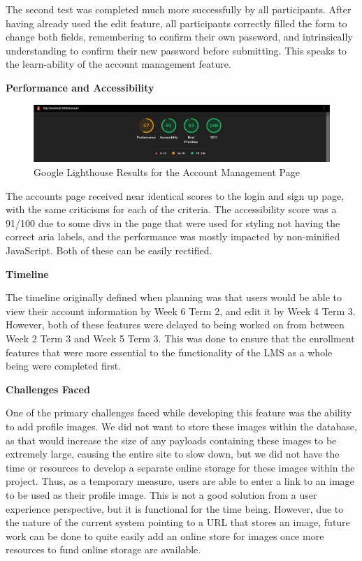 The second test was completed much more successfully by all participants. After having already used the edit feature, all participants correctly filled the form to change both fields, remembering to confirm their own password, and intrinsically understanding to confirm their new password before submitting. This speaks to the learn-ability of the account management feature.

\textbf{Performance and Accessibility}

\begin{figure}[h!]
    \centering
    \includegraphics[scale=0.3]{images/accounts-accounts-lighthouse.jpg}
    \caption{Google Lighthouse Results for the Account Management Page}
\end{figure}
The accounts page received near identical scores to the login and sign up page, with the same criticisms for each of the criteria. The accessibility score was a 91/100 due to some divs in the page that were used for styling not having the correct aria labels, and the performance was mostly impacted by non-minified JavaScript. Both of these can be easily rectified.

\textbf{Timeline}

The timeline originally defined when planning was that users would be able to view their account information by Week 6 Term 2, and edit it by Week 4 Term 3. However, both of these features were delayed to being worked on from between Week 2 Term 3 and Week 5 Term 3. This was done to ensure that the enrollment features that were more essential to the functionality of the LMS as a whole being were completed first.

\textbf{Challenges Faced}

One of the primary challenges faced while developing this feature was the ability to add profile images. We did not want to store these images within the database, as that would increase the size of any payloads containing these images to be extremely large, causing the entire site to slow down, but we did not have the time or resources to develop a separate online storage for these images within the project. Thus, as a temporary measure, users are able to enter a link to an image to be used as their profile image. This is not a good solution from a user experience perspective, but it is functional for the time being. However, due to the nature of the current system pointing to a URL that stores an image, future work can be done to quite easily add an online store for images once more resources to fund online storage are available.


